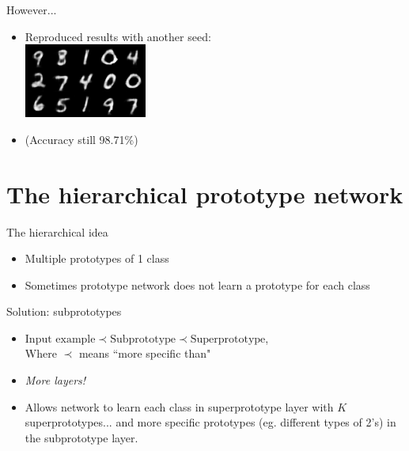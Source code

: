 \documentclass{beamer}[169]
\begin{document}
\begin{frame}{However...}
\begin{itemize} 
\item Reproduced results with another seed:\\

\includegraphics[scale=0.9]{img/reproduced9.png}

\item (Accuracy still 98.71\%)
\end{itemize}
\end{frame}


\section{The hierarchical prototype network}
\begin{frame}{The hierarchical idea}
\begin{itemize}
    \item Multiple prototypes of 1 class 
    \item Sometimes prototype network does not learn a prototype for each class
\end{itemize}
Solution: \alert{subprototypes}\pause
\begin{itemize}
    \item $ \text{Input example}\prec \text{Subprototype}\prec \text{Superprototype}$, \\
    Where $\prec$ means ``more specific than"
    \item \emph{More layers!}
    \item Allows network to learn each class in superprototype layer with $K$ superprototypes... \pause and more specific prototypes (eg. different types of 2's) in the subprototype layer.
\end{itemize}
\end{frame}
\end{document}
